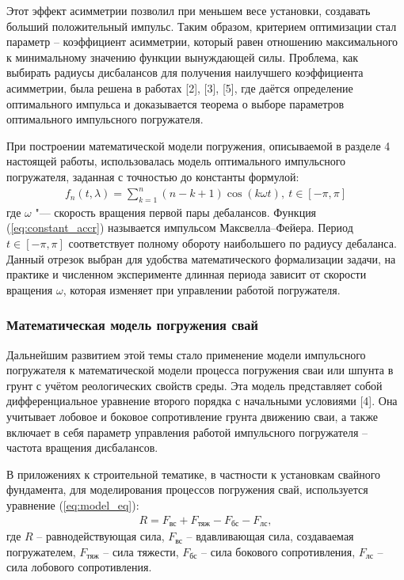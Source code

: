 Этот эффект асимметрии позволил при меньшем весе установки, создавать больший положительный импульс. Таким образом, критерием
оптимизации стал параметр – коэффициент асимметрии, который равен отношению максимального к минимальному значению функции
вынуждающей силы. Проблема, как выбирать радиусы дисбалансов для получения наилучшего коэффициента асимметрии, была решена в работах [2],
[3], [5], где даётся определение оптимального импульса и доказывается теорема о выборе параметров оптимального импульсного погружателя.

При построении математической модели погружения, описываемой в разделе 4 настоящей работы, использовалась модель оптимального
импульсного погружателя, заданная с точностью до константы формулой:
\begin{equation}\label{eq:constant_accr}
    \begin{gathered}
        f_n(t,\lambda) = \sum\limits_{k = 1}^n (n-k+1) \cos(k \omega t), \ t \in [-\pi, \pi]
    \end{gathered}
\end{equation}
\noindent где $\omega$ "--- скорость вращения первой пары дебалансов. Функция (\ref{eq:constant_accr}) называется импульсом Максвелла–Фейера.
Период $t \in [-\pi, \pi]$ соответствует полному обороту наибольшего по радиусу дебаланса. Данный отрезок выбран для
удобства математического формализации задачи, на практике и численном эксперименте длинная периода зависит от скорости вращения $\omega$,
которая изменяет при управлении работой погружателя.

\subsubsection{Математическая модель погружения свай}

Дальнейшим развитием этой темы стало применение модели импульсного погружателя к математической модели процесса погружения
сваи или шпунта в грунт с учётом реологических свойств среды. Эта модель представляет собой дифференциальное уравнение второго порядка с
начальными условиями [4]. Она учитывает лобовое и боковое сопротивление грунта движению сваи, а также включает в себя параметр управления работой
импульсного погружателя – частота вращения дисбалансов.

В приложениях к строительной тематике, в частности к установкам свайного фундамента, для моделирования процессов погружения свай, используется уравнение (\ref{eq:model_eq}):
\begin{equation}\label{eq:model_eq}
    \begin{gathered}
        R = F_{\textrm{вс}} + F_{\textrm{тяж}} - F_{\textrm{бс}} - F_{\textrm{лс}},
    \end{gathered}
\end{equation}
\noindent где $R$ – равнодействующая сила, $F_{\textrm{вс}}$ – вдавливающая сила, создаваемая погружателем, $F_{\textrm{тяж}}$ – сила тяжести, $F_{\textrm{бс}}$ – сила бокового сопротивления, $F_{\textrm{лс}}$ – сила лобового сопротивления.

